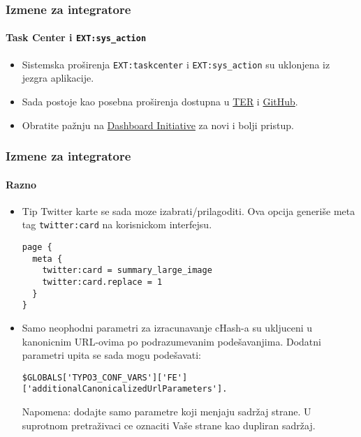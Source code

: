 
\begin{frame}[fragile]
	\frametitle{Izmene za integratore}
	\framesubtitle{Task Center i \texttt{EXT:sys\_action}}

	\begin{itemize}

		\item Sistemska proširenja \texttt{EXT:taskcenter} i \texttt{EXT:sys\_action}
			su uklonjena iz jezgra aplikacije.

		\item Sada postoje kao posebna proširenja dostupna u
			\href{https://extensions.typo3.org/}{TER}
			i
			\href{https://github.com/FriendsOfTYPO3}{GitHub}.

		\item Obratite pažnju na
			\href{https://typo3.org/community/teams/typo3-development/initiatives/typo3-dashboard-initiative/}{Dashboard Initiative}
			za novi i bolji pristup.

	\end{itemize}

\end{frame}


\begin{frame}[fragile]
	\frametitle{Izmene za integratore}
	\framesubtitle{Razno}

	\lstset{basicstyle=\tiny\ttfamily}

	\begin{itemize}

		\item Tip Twitter karte se sada moze izabrati/prilagoditi.
			Ova opcija generiše meta tag \texttt{twitter:card} na korisnickom interfejsu.

\begin{lstlisting}
page {
  meta {
    twitter:card = summary_large_image
    twitter:card.replace = 1
  }
}
\end{lstlisting}

		\item Samo neophodni parametri za izracunavanje cHash-a su ukljuceni u kanonicnim URL-ovima po podrazumevanim podešavanjima.
			Dodatni parametri upita se sada mogu podešavati:

\begin{lstlisting}
$GLOBALS['TYPO3_CONF_VARS']['FE']['additionalCanonicalizedUrlParameters'].
\end{lstlisting}

		\smaller
			Napomena: dodajte samo parametre koji menjaju sadržaj strane. U suprotnom pretraživaci ce oznaciti Vaše strane kao dupliran sadržaj.
		\normalsize

	\end{itemize}

\end{frame}

